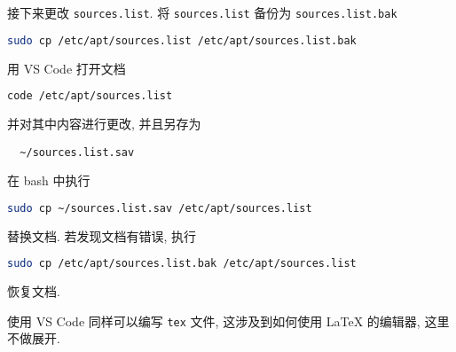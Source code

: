 接下来更改 \texttt{sources.list}.
将 \texttt{sources.list} 备份为 \texttt{sources.list.bak}
\begin{lstlisting}[language=bash]
  sudo cp /etc/apt/sources.list /etc/apt/sources.list.bak
\end{lstlisting}
用 VS Code 打开文档
\begin{lstlisting}[language=bash]
  code /etc/apt/sources.list
\end{lstlisting}
并对其中内容进行更改,
并且另存为
\begin{lstlisting}
  ~/sources.list.sav
\end{lstlisting}
在 \textsf{bash} 中执行
\begin{lstlisting}[language=bash]
  sudo cp ~/sources.list.sav /etc/apt/sources.list
\end{lstlisting}
替换文档.
若发现文档有错误,
执行
\begin{lstlisting}[language=bash]
  sudo cp /etc/apt/sources.list.bak /etc/apt/sources.list
\end{lstlisting}
恢复文档.

使用 VS Code 同样可以编写 \texttt{tex} 文件,
这涉及到如何使用 \LaTeX{} 的编辑器,
这里不做展开.